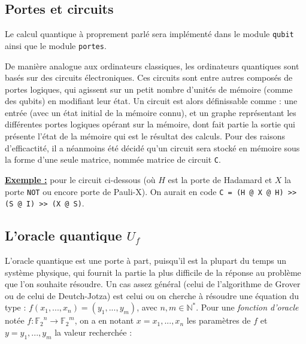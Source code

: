 \documentclass[french]{article}
\newcommand{\p}{\texttt} %
\newcommand{\exemple}{\textbf{\underline{Exemple :} }}
\begin{document}
\subsection{Portes et circuits}

Le calcul quantique à proprement parlé sera implémenté dans le module \p{qubit} ainsi que le module \p{portes}.

De manière analogue aux ordinateurs classiques, les ordinateurs quantiques sont basés sur des circuits électroniques. Ces circuits sont entre autres composés de portes logiques, qui agissent sur un petit nombre d'unités de mémoire (comme des qubits) en modifiant leur état. Un circuit est alors définissable comme : une entrée (avec un état initial de la mémoire connu), et un graphe représentant les différentes portes logiques opérant sur la mémoire, dont fait partie la sortie qui présente l'état de la mémoire qui est le résultat des calculs. Pour des raisons d'efficactité, il a néanmoins été décidé qu'un circuit sera stocké en mémoire sous la forme d'une seule matrice, nommée matrice de circuit \p{C}. \newline

\noindent \exemple pour le circuit ci-dessous (où $H$ est la porte de Hadamard et $X$ la porte \p{NOT} ou encore porte de Pauli-X). On aurait en code \texttt{C = (H @  X @ H) >> (S @ I) >> (X @ S)}.


\subsection{L'oracle quantique $U_f$}

L'oracle quantique est une porte à part, puisqu'il est la plupart du temps un système physique, qui fournit la partie la plus difficile de la réponse au problème que l'on souhaite résoudre. Un cas assez général (celui de l'algorithme de Grover ou de celui de Deutch-Jotza) est celui ou on cherche à résoudre une équation du type : $f(x_1, ..., x_n) = (y_1, ..., y_m)$, avec $n, m \in \mathbb{N}^*$. Pour une \textit{fonction d'oracle} notée $f : {\mathbb{F}_2} ^ n \rightarrow {\mathbb{F}_2} ^ m$, on a en notant $x = x_1, ..., x_n$ les paramètres de $f$ et $y = y_1, ..., y_m$ la valeur recherchée :
\end{document}
